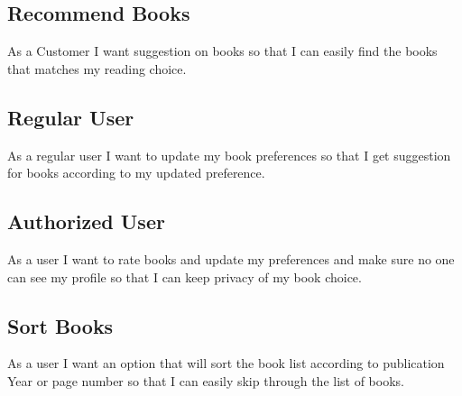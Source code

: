\documentclass{article}
\begin{document}
\subsection{Recommend Books}
As a Customer I want suggestion on books so that I can easily find the books that matches my reading choice.

\subsection{Regular User}
As a regular user I want to update my book preferences so that I get suggestion for books according to my updated preference.

\subsection{Authorized User}
As a user I want to rate books and update my preferences and make sure no one can see my profile so that I can keep privacy of my book choice.

\subsection{Sort Books}
As a user I want an option that will sort the book list according to publication Year or page number so that I can easily skip through the list of books.
\end{document}
